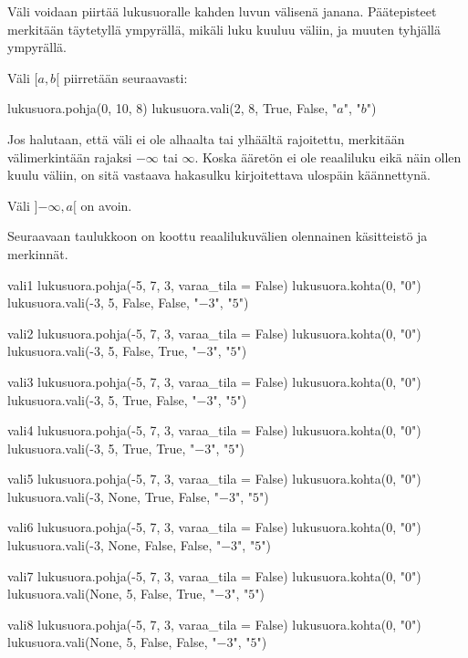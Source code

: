 Väli voidaan piirtää lukusuoralle kahden luvun välisenä janana. Päätepisteet merkitään täytetyllä ympyrällä, mikäli luku kuuluu väliin, ja muuten tyhjällä ympyrällä.

\begin{esimerkki}
Väli $[a, b[$ piirretään seuraavasti:

\begin{kuva}
lukusuora.pohja(0, 10, 8)
lukusuora.vali(2, 8, True, False, "$a$", "$b$")
\end{kuva}
\end{esimerkki}

Jos halutaan, että väli ei ole alhaalta tai ylhäältä rajoitettu, merkitään välimerkintään rajaksi $-\infty$ tai $\infty$. Koska ääretön ei ole reaaliluku eikä näin ollen kuulu väliin, on sitä vastaava hakasulku kirjoitettava ulospäin käännettynä.

\begin{esimerkki}
Väli $]{-\infty}, a[$ on avoin. 
\end{esimerkki}

Seuraavaan taulukkoon on koottu reaalilukuvälien olennainen käsitteistö ja merkinnät.

\begin{luoKuva}{vali1}
lukusuora.pohja(-5, 7, 3, varaa_tila = False)
lukusuora.kohta(0, "$0$")
lukusuora.vali(-3, 5, False, False, "$-3$", "$5$")
\end{luoKuva}
\begin{luoKuva}{vali2}
lukusuora.pohja(-5, 7, 3, varaa_tila = False)
lukusuora.kohta(0, "$0$")
lukusuora.vali(-3, 5, False, True, "$-3$", "$5$")
\end{luoKuva}
\begin{luoKuva}{vali3}
lukusuora.pohja(-5, 7, 3, varaa_tila = False)
lukusuora.kohta(0, "$0$")
lukusuora.vali(-3, 5, True, False, "$-3$", "$5$")
\end{luoKuva}
\begin{luoKuva}{vali4}
lukusuora.pohja(-5, 7, 3, varaa_tila = False)
lukusuora.kohta(0, "$0$")
lukusuora.vali(-3, 5, True, True, "$-3$", "$5$")
\end{luoKuva}
\begin{luoKuva}{vali5}
lukusuora.pohja(-5, 7, 3, varaa_tila = False)
lukusuora.kohta(0, "$0$")
lukusuora.vali(-3, None, True, False, "$-3$", "$5$")
\end{luoKuva}
\begin{luoKuva}{vali6}
lukusuora.pohja(-5, 7, 3, varaa_tila = False)
lukusuora.kohta(0, "$0$")
lukusuora.vali(-3, None, False, False, "$-3$", "$5$")
\end{luoKuva}
\begin{luoKuva}{vali7}
lukusuora.pohja(-5, 7, 3, varaa_tila = False)
lukusuora.kohta(0, "$0$")
lukusuora.vali(None, 5, False, True, "$-3$", "$5$")
\end{luoKuva}
\begin{luoKuva}{vali8}
lukusuora.pohja(-5, 7, 3, varaa_tila = False)
lukusuora.kohta(0, "$0$")
lukusuora.vali(None, 5, False, False, "$-3$", "$5$")
\end{luoKuva}

